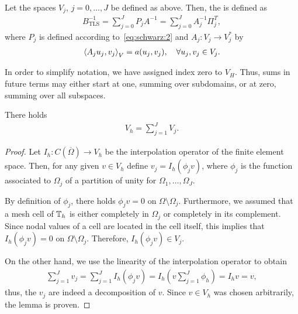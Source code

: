 \begin{definition}
  Let the spaces $V_j$, $j=0,\dots,J$ be defined as above. Then, the
   is defined as
  \begin{gather}
    \label{eq:schwarz:10}
    B^{-1}_{\text{TLS}} = \sum_{j=0}^J P_j A^{-1} = \sum_{j=0}^J A_j^{-1} \Pi^T_j,
  \end{gather}
  where $P_j$ is defined according to~\eqref{eq:schwarz:2} and $A_j:
  V_j\to V_j^*$ by
  \begin{gather}
    \scal(A_j u_j, v_j)_V = a(u_j, v_j),\quad\forall u_j, v_j \in V_j.
  \end{gather}
\end{definition}

\begin{note}
  In order to simplify notation, we have assigned index zero to
  $V_H$. Thus, sums in future terms may either start at one, summing
  over subdomains, or at zero, summing over all subspaces.
\end{note}

\begin{lemma}
  \label{lemma:schwarz:4}
  There holds
  \begin{gather}
    \label{eq:schwarz:11}
    V_h = \sum_{j=1}^J V_j.
  \end{gather}
\end{lemma}

\begin{proof}
  Let $I_h: C(\overline\Omega) \to V_h$ be the interpolation operator
  of the finite element space. Then, for any given $v\in V_h$ define
  $v_j = I_h(\phi_j v)$, where $\phi_j$ is the function associated to
  $\Omega_j$ of a partition of unity for $\Omega_1,\dots,\Omega_J$.
  
  By definition of $\phi_j$, there holds $\phi_j v = 0$ on
  $\Omega\setminus\Omega_j$. Furthermore, we assumed that a mesh cell
  of $\mathbb T_h$ is either completely in $\Omega_j$ or completely in its
  complement. Since nodal values of a cell are located in the cell
  itself, this implies that $I_h (\phi_j v) = 0$ on
  $\Omega\setminus\Omega_j$. Therefore, $I_h (\phi_j v) \in V_j$.
  
  On the other hand, we use the linearity of the interpolation
  operator to obtain
  \begin{gather*}
    \sum_{j=1}^J v_j = \sum_{j=1}^J I_h(\phi_j v)
    = I_h\left(v\sum_{j=1}^J \phi_h\right)
    = I_h v = v,
  \end{gather*}
  thus, the $v_j$ are indeed a decomposition of $v$. Since $v\in V_h$
  was chosen arbitrarily, the lemma is proven.
\end{proof}

